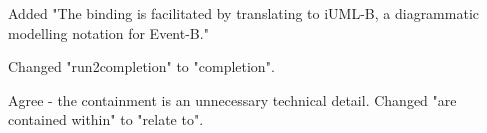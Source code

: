 \documentclass{response}
\begin{document}
\begin{response}
\end{response}

\begin{comment}{Reviewer \#3}
  Page 2:

  * Top: The first paragraph can be expressed more clearly. That is:
  what is the approach taken? Is UML state charts mapped to iUML-B or
  not?
\end{comment}

\begin{response}
Added "The binding is facilitated by translating to iUML-B, a diagrammatic modelling notation for Event-B."
\end{response}

\begin{comment}{Reviewer \#3}
  Page 2:
  
  * Second paragraph appears complicated writing.
\end{comment}

\begin{response}
\end{response}

\begin{comment}{Reviewer \#3}
  Page 3:

* Listing 1: I think I would name that variable "run2completion" differently.
\end{comment}

\begin{response}
	Changed "run2completion" to "completion".
\end{response}


\begin{comment}{Reviewer \#3}
  Page 4:

  * Mid, it is not clear what this means:

  "The diagrammatic models are contained within an Event-B machine"
\end{comment}

\begin{response}
	Agree - the containment is an unnecessary technical detail. Changed "are contained within" to "relate to".
\end{response}
\end{document}
